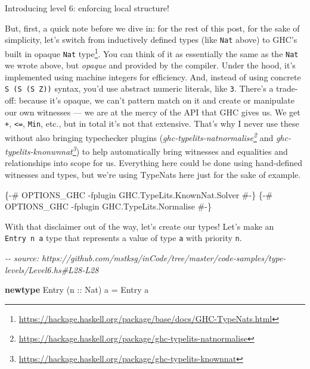 \documentclass[]{article}
\newenvironment{Shaded}{}{}
\newcommand{\CommentTok}[1]{\textcolor[rgb]{0.38,0.63,0.69}{\textit{#1}}}
\newcommand{\DataTypeTok}[1]{\textcolor[rgb]{0.56,0.13,0.00}{#1}}
\newcommand{\KeywordTok}[1]{\textcolor[rgb]{0.00,0.44,0.13}{\textbf{#1}}}
\newcommand{\NormalTok}[1]{#1}
\newcommand{\OtherTok}[1]{\textcolor[rgb]{0.00,0.44,0.13}{#1}}
\renewcommand{\href}[2]{#2\footnote{\url{#1}}}
\begin{document}
Introducing level 6: enforcing local structure!

But, first, a quick note before we dive in: for the rest of this post, for the
sake of simplicity, let's switch from inductively defined types (like
\texttt{Nat} above) to GHC's built in
\href{https://hackage.haskell.org/package/base/docs/GHC-TypeNats.html}{opaque
\texttt{Nat} type}. You can think of it as essentially the same as the
\texttt{Nat} we wrote above, but \emph{opaque} and provided by the compiler.
Under the hood, it's implemented using machine integers for efficiency. And,
instead of using concrete \texttt{S\ (S\ (S\ Z))} syntax, you'd use abstract
numeric literals, like \texttt{3}. There's a trade-off: because it's opaque, we
can't pattern match on it and create or manipulate our own witnesses --- we are
at the mercy of the API that GHC gives us. We get \texttt{+},
\texttt{\textless{}=}, \texttt{Min}, etc., but in total it's not that extensive.
That's why I never use these without also bringing typechecker plugins
(\emph{\href{https://hackage.haskell.org/package/ghc-typelits-natnormalise}{ghc-typelits-natnormalise}}
and
\emph{\href{https://hackage.haskell.org/package/ghc-typelits-knownnat}{ghc-typelits-knonwnnat}})
to help automatically bring witnesses and equalities and relationships into
scope for us. Everything here could be done using hand-defined witnesses and
types, but we're using TypeNats here just for the sake of example.

\begin{Shaded}
\begin{Highlighting}[]
\OtherTok{\{{-}\# OPTIONS\_GHC {-}fplugin GHC.TypeLits.KnownNat.Solver \#{-}\}}
\OtherTok{\{{-}\# OPTIONS\_GHC {-}fplugin GHC.TypeLits.Normalise \#{-}\}}
\end{Highlighting}
\end{Shaded}

With that disclaimer out of the way, let's create our types! Let's make an
\texttt{Entry\ n\ a} type that represents a value of type \texttt{a} with
priority \texttt{n}.

\begin{Shaded}
\begin{Highlighting}[]
\CommentTok{{-}{-} source: https://github.com/mstksg/inCode/tree/master/code{-}samples/type{-}levels/Level6.hs\#L28{-}L28}

\KeywordTok{newtype} \DataTypeTok{Entry}\NormalTok{ (}\OtherTok{n ::} \DataTypeTok{Nat}\NormalTok{) a }\OtherTok{=} \DataTypeTok{Entry}\NormalTok{ a}
\end{Highlighting}
\end{Shaded}
\end{document}
